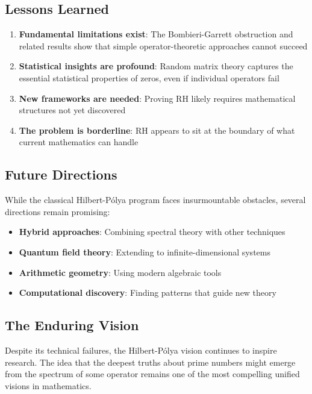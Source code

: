 \subsection{Lessons Learned}

\begin{enumerate}
\item \textbf{Fundamental limitations exist}: The Bombieri-Garrett obstruction and related results show that simple operator-theoretic approaches cannot succeed

\item \textbf{Statistical insights are profound}: Random matrix theory captures the essential statistical properties of zeros, even if individual operators fail

\item \textbf{New frameworks are needed}: Proving RH likely requires mathematical structures not yet discovered

\item \textbf{The problem is borderline}: RH appears to sit at the boundary of what current mathematics can handle
\end{enumerate}

\subsection{Future Directions}

While the classical Hilbert-Pólya program faces insurmountable obstacles, several directions remain promising:

\begin{itemize}
\item \textbf{Hybrid approaches}: Combining spectral theory with other techniques
\item \textbf{Quantum field theory}: Extending to infinite-dimensional systems
\item \textbf{Arithmetic geometry}: Using modern algebraic tools
\item \textbf{Computational discovery}: Finding patterns that guide new theory
\end{itemize}

\subsection{The Enduring Vision}

Despite its technical failures, the Hilbert-Pólya vision continues to inspire research. The idea that the deepest truths about prime numbers might emerge from the spectrum of some operator remains one of the most compelling unified visions in mathematics.

